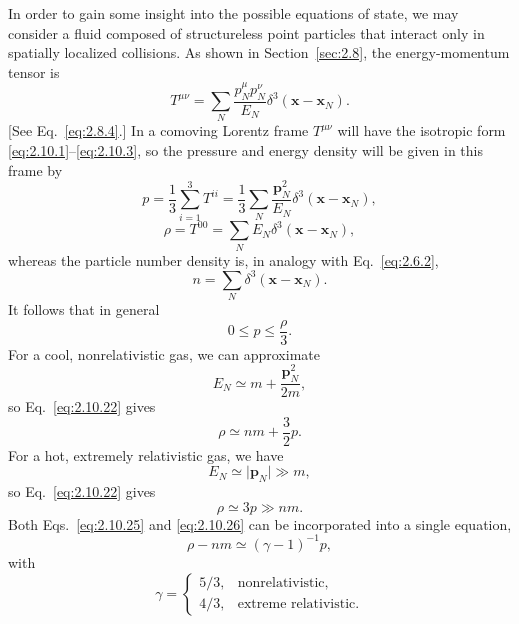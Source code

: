 In order to gain some insight into the possible equations of state, we may
consider a fluid composed of structureless point particles that interact only in
spatially localized collisions. As shown in Section~\ref{sec:2.8}, the
energy-momentum tensor is
\begin{equation}
  T^{\mu\nu}
  =\sum_N\frac{p_N^\mu p_N^\nu}{E_N}
  \delta^3(\mathbf x-\mathbf x_N).
  \tag{2.10.20}\label{eq:2.10.20}
\end{equation}
[See Eq.~\eqref{eq:2.8.4}.] In a comoving Lorentz frame \(T^{\mu\nu}\) will
have the isotropic form \eqref{eq:2.10.1}--\eqref{eq:2.10.3}, so the
pressure and energy density will be given in this frame by
\begin{equation}
  p=\frac13\sum_{i=1}^{3}T^{ii}
  =\frac13\sum_N\frac{\mathbf p_N^2}{E_N}
    \delta^3(\mathbf x-\mathbf x_N),
  \tag{2.10.21}\label{eq:2.10.21}
\end{equation}
\begin{equation}
  \rho=T^{00}
  =\sum_NE_N\delta^3(\mathbf x-\mathbf x_N),
  \tag{2.10.22}\label{eq:2.10.22}
\end{equation}
whereas the particle number density is, in analogy with Eq.~\eqref{eq:2.6.2},
\begin{equation}
  n=\sum_N\delta^3(\mathbf x-\mathbf x_N).
  \tag{2.10.23}\label{eq:2.10.23}
\end{equation}
It follows that in general
\begin{equation}
  0\leq p\leq\frac{\rho}{3}.
  \tag{2.10.24}\label{eq:2.10.24}
\end{equation}
For a cool, nonrelativistic gas, we can approximate
\[
  E_N\simeq m+\frac{\mathbf p_N^2}{2m},
\]
so Eq.~\eqref{eq:2.10.22} gives
\begin{equation}
  \rho\simeq nm+\frac32p .
  \tag{2.10.25}\label{eq:2.10.25}
\end{equation}
For a hot, extremely relativistic gas, we have
\[
  E_N\simeq\lvert\mathbf p_N\rvert\gg m ,
\]
so Eq.~\eqref{eq:2.10.22} gives
\begin{equation}
  \rho\simeq3p\gg nm .
  \tag{2.10.26}\label{eq:2.10.26}
\end{equation}
Both Eqs.~\eqref{eq:2.10.25} and \eqref{eq:2.10.26} can be incorporated
into a single equation,
\begin{equation}
  \rho-nm\simeq(\gamma-1)^{-1}p ,
  \tag{2.10.27}\label{eq:2.10.27}
\end{equation}
with
\begin{equation}
  \gamma=
  \begin{cases}
    5/3,&\text{nonrelativistic},\\
    4/3,&\text{extreme relativistic}.
  \end{cases}
  \tag{2.10.28}\label{eq:2.10.28}
\end{equation}
